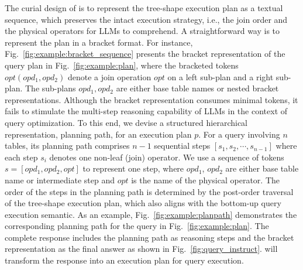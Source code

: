 The curial design of \QueryInstruct is to represent the tree-shape execution plan as a textual sequence, which preserves the intact execution strategy, i.e., the join order and the physical operators for LLMs to comprehend. 
A straightforward way is to represent the plan in a bracket format. For instance, Fig.~\ref{fig:example:bracket_sequence} presents the bracket representation of the query plan in Fig.~\ref{fig:example:plan}, where the bracketed tokens $opt(opd_1, opd_2)$ denote a join operation $opt$ on a left sub-plan and a right sub-plan. 
The sub-plans $opd_1, opd_2$ are either base table names or nested bracket representations. 
Although the bracket representation consumes minimal tokens, it fails to stimulate the multi-step reasoning capability of LLMs in the context of query optimization.
%
To this end, we devise a structured hierarchical representation, planning path, for an execution plan $p$. For a query involving $n$ tables, its planning path comprises $n - 1$ sequential steps $[s_1, s_2, \cdots, s_{n-1}]$ where each step $s_i$ denotes one non-leaf (join) operator. We use a sequence of tokens $s = [ opd_1, opd_2, opt ]$ to represent one step, where $opd_1$, $opd_2$ are either base table name or intermediate step and $opt$ is the name of the physical operator.  
The order of the steps in the planning path is determined by the post-order traversal of the tree-shape execution plan, which also aligns with the bottom-up query execution semantic.
As an example, Fig.~\ref{fig:example:planpath} demonstrates the corresponding planning path for the query in Fig.~\ref{fig:example:plan}. 
The complete response includes the planning path as reasoning steps and the bracket representation as the final answer as shown in Fig.~\ref{fig:query_instruct}. 
\LLMQO will transform the response into an execution plan for query execution.


